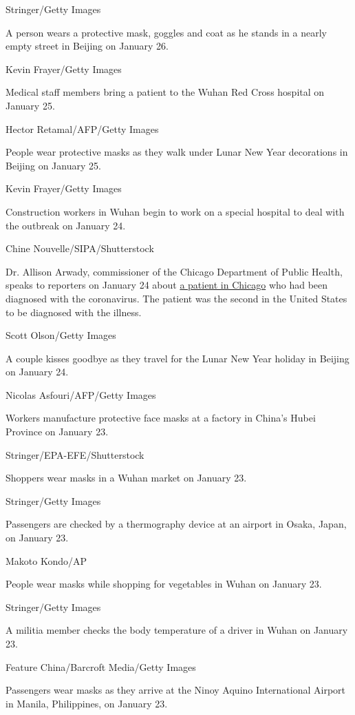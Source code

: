 Stringer/Getty Images

A person wears a protective mask, goggles and coat as he stands in a
nearly empty street in Beijing on January 26.

Kevin Frayer/Getty Images

Medical staff members bring a patient to the Wuhan Red Cross hospital on
January 25.

Hector Retamal/AFP/Getty Images

People wear protective masks as they walk under Lunar New Year
decorations in Beijing on January 25.

Kevin Frayer/Getty Images

Construction workers in Wuhan begin to work on a special hospital to
deal with the outbreak on January 24.

Chine Nouvelle/SIPA/Shutterstock

Dr. Allison Arwady, commissioner of the Chicago Department of Public
Health, speaks to reporters on January 24 about
\href{https://www.cnn.com/2020/01/24/health/wuhan-coronavirus-chicago-cdc/index.html}{a
patient in Chicago} who had been diagnosed with the coronavirus. The
patient was the second in the United States to be diagnosed with the
illness.

Scott Olson/Getty Images

A couple kisses goodbye as they travel for the Lunar New Year holiday in
Beijing on January 24.

Nicolas Asfouri/AFP/Getty Images

Workers manufacture protective face masks at a factory in China's Hubei
Province on January 23.

Stringer/EPA-EFE/Shutterstock

Shoppers wear masks in a Wuhan market on January 23.

Stringer/Getty Images

Passengers are checked by a thermography device at an airport in Osaka,
Japan, on January 23.

Makoto Kondo/AP

People wear masks while shopping for vegetables in Wuhan on January 23.

Stringer/Getty Images

A militia member checks the body temperature of a driver in Wuhan on
January 23.

Feature China/Barcroft Media/Getty Images

Passengers wear masks as they arrive at the Ninoy Aquino International
Airport in Manila, Philippines, on January 23.

